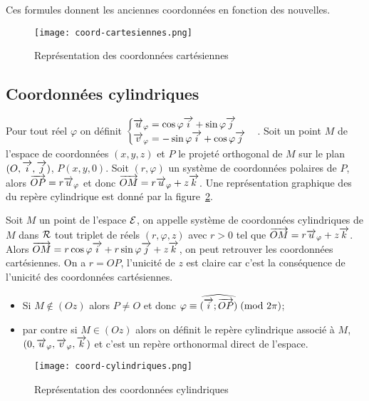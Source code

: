 \danger Ces formules donnent les \og{}anciennes\fg{} coordonnées en fonction des 
\og{}nouvelles\fg{}.

\begin{figure}
  \centering
  \texttt{[image: coord-cartesiennes.png]}
  \caption{Représentation des coordonnées cartésiennes}
  \label{fig:repcart}
\end{figure}

\subsection{Coordonnées cylindriques}
\label{subsec:coordcyl}
Pour tout réel \(\varphi\) on définit \(
\begin{cases}
  \overrightarrow{u}_\varphi = \cos\varphi\overrightarrow{i} + \sin\varphi\overrightarrow{j} \\ \overrightarrow{v}_\varphi = -\sin\varphi\overrightarrow{i} 
  + \cos\varphi\overrightarrow{j}
\end{cases}\).  Soit un point \(M\) de l'espace de coordonnées \((x, y, z)\) et 
\(P\) le projeté orthogonal de \(M\) sur le plan \((O,\overrightarrow{i},\overrightarrow{j})\), \(P(x, y, 0)\). Soit 
\((r, \varphi)\) un système de coordonnées polaires de \(P\), alors \(\overrightarrow{OP} 
= r\overrightarrow{u}_\varphi\) et donc \(\overrightarrow{OM} = r\overrightarrow{u}_\varphi + z\overrightarrow{k}\). Une représentation 
graphique des du repère cylindrique est donné par la figure~\ref{fig:repcyl}.

\begin{defdef}
  Soit \(M\) un point de l'espace \(\mathcal{E}\), on appelle système de coordonnées 
  cylindriques de \(M\) dans \(\mathcal{R}\) tout triplet de réels \((r, \varphi, z)\) 
  avec \(r>0\) tel que \(\overrightarrow{OM} = r\overrightarrow{u}_\varphi + z\overrightarrow{k}\). Alors \(\overrightarrow{OM} = 
  r\cos\varphi\overrightarrow{i} + r\sin\varphi\overrightarrow{j} + z\overrightarrow{k}\), on peut retrouver les coordonnées 
  cartésiennes. On a \(r = OP\), l'unicité de \(z\) est claire car c'est la 
  conséquence de l'unicité des coordonnées cartésiennes.  \begin{itemize}
    \item Si \(M\notin(Oz)\) alors \(P\neq O\) et donc 
      \(\varphi \equiv \widehat{(\overrightarrow{i};\overrightarrow{OP})}\!\pmod {2\pi}\);
    \item par contre si \(M\in(Oz)\) alors on définit le repère cylindrique 
      associé à \(M\), \((0, \overrightarrow{u}_\varphi, \overrightarrow{v}_\varphi, \overrightarrow{k})\) et c'est un repère 
      orthonormal direct de l'espace.
  \end{itemize}
\end{defdef}

\begin{figure}
  \centering
  \texttt{[image: coord-cylindriques.png]}
  \caption{Représentation des coordonnées cylindriques}
  \label{fig:repcyl}
\end{figure}

